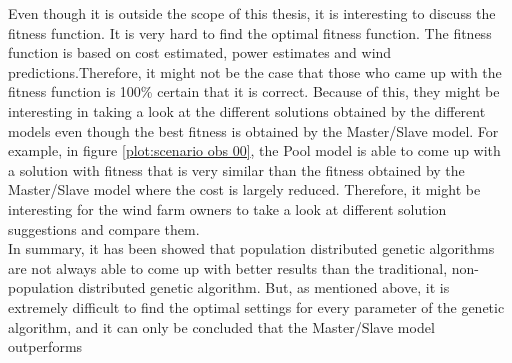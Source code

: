 \noindent Even though it is outside the scope of this thesis, it is interesting to discuss the fitness function. It is very hard to find the optimal fitness function. The fitness function is based on cost estimated, power estimates and wind predictions.Therefore, it might not be the case that those who came up with the fitness function is 100\% certain that it is correct. Because of this, they might be interesting in taking a look at the different solutions obtained by the different models even though the best fitness is obtained by the Master/Slave model. For example, in figure \ref{plot:scenario obs 00}, the Pool model is able to come up with a solution with fitness that is very similar than the fitness obtained by the Master/Slave model where the cost is largely reduced. Therefore, it might be interesting for the wind farm owners to take a look at different solution suggestions and compare them.\\

\noindent In summary, it has been showed that population distributed genetic algorithms are not always able to come up with better results than the traditional, non-population distributed genetic algorithm. But, as mentioned above, it is extremely difficult to find the optimal settings for every parameter of the genetic algorithm, and it can only be concluded that the Master/Slave model outperforms\\











